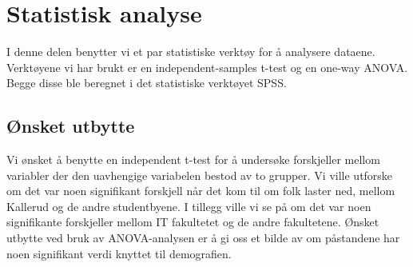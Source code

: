 \section{Statistisk analyse}
I denne delen benytter vi et par statistiske verktøy for å analysere dataene. Verktøyene vi har brukt er en independent-samples t-test og en one-way ANOVA. Begge disse ble beregnet i det statistiske verktøyet SPSS.


\subsection{Ønsket utbytte}
Vi ønsket å benytte en independent t-test for å undersøke forskjeller mellom variabler der den uavhengige variabelen bestod av to grupper. Vi ville utforske om det var noen signifikant forskjell når det kom til om folk laster ned, mellom Kallerud og de andre studentbyene. I tillegg ville vi se på om det var noen signifikante forskjeller mellom IT fakultetet og de andre fakultetene. Ønsket utbytte ved bruk av ANOVA-analysen er å gi oss et bilde av om påstandene har noen signifikant verdi knyttet til demografien.



